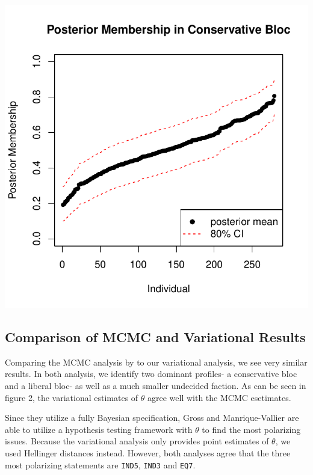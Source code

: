 \documentclass{article}\usepackage[]{graphicx}\usepackage[]{color}
\makeatletter
\def\maxwidth{ %
  \ifdim\Gin@nat@width>\linewidth
    \linewidth
  \else
    \Gin@nat@width
  \fi
}
\newenvironment{knitrout}{}{} %
\renewenvironment{knitrout}{\begin{singlespace}}{\end{singlespace}}
\makeatother
\begin{document}
\begin{knitrout}
{\centering \includegraphics[width=\maxwidth]{figure/unnamed-chunk-15-1} 

}



\end{knitrout}


\subsection{Comparison of MCMC and Variational Results}
Comparing the MCMC analysis by \cite[Gross and Manrique-Vallier, CH6]{Airoldi2014Handbook} to our variational analysis, we see very similar results. In both analysis, we identify two dominant profiles- a conservative bloc and a liberal bloc- as well as a much smaller undecided faction. As can be seen in figure 2, the variational estimates of $\theta$ agree well with the MCMC esetimates.

Since they utilize a fully Bayesian specification, Gross and Manrique-Vallier are able to utilize a hypothesis testing framework with $\theta$ to find the most polarizing issues. Because the variational analysis only provides point estimates of $\theta$, we used Hellinger distances instead. However, both analyses agree that the three most polarizing statements are  \texttt{IND5}, \texttt{IND3} and \texttt{EQ7}.
\end{document}
